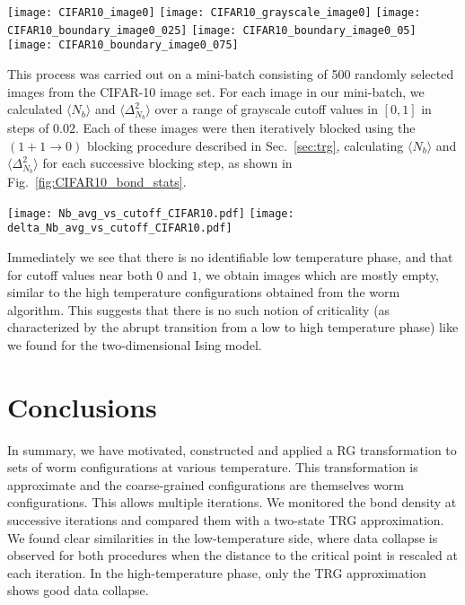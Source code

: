 \documentclass[../main.tex]{subfiles}
\begin{document}
\begin{figure*}[htpb]
    \centering
    \texttt{[image: CIFAR10\_image0]}\hspace{1.5cm}
    \texttt{[image: CIFAR10\_grayscale\_image0]}
    \texttt{[image: CIFAR10\_boundary\_image0\_025]}\hfill
    \texttt{[image: CIFAR10\_boundary\_image0\_05]}\hfill
    \texttt{[image: CIFAR10\_boundary\_image0\_075]}
    \caption{\label{fig:CIFAR10_preprocessing} Example of preprocessing steps
        for converting CIFAR-10 images to `worm-like' images, illustrating the
        resulting image for different values of the grayscale cuttoff. (a)
    Original image from CIFAR-10 dataset. (b) Image converted to grayscale.
    (c) Resulting image from cutoff values of $0.25$, (d) $0.5$, and (e)
    $0.75$.}
\end{figure*}
%
%
This process was carried out on a mini-batch consisting of 500 randomly
selected images from the CIFAR-10 image set.  For each image in our mini-batch,
we calculated $\langle N_b\rangle$ and $\langle \Delta_{N_b}^2\rangle$ over a
range of grayscale cutoff values in $[0, 1]$ in steps of $0.02$. Each of these
images were then iteratively blocked using the $(1 + 1 \rightarrow 0)$ blocking
procedure described in Sec.~\ref{sec:trg}, calculating $\langle N_b\rangle$ and
$\langle \Delta_{N_b}^2\rangle$ for each successive blocking step, as shown in
Fig.~\ref{fig:CIFAR10_bond_stats}.
%
\begin{figure*}[htpb]
    \centering
    \texttt{[image: Nb\_avg\_vs\_cutoff\_CIFAR10.pdf]}
    \texttt{[image: delta\_Nb\_avg\_vs\_cutoff\_CIFAR10.pdf]}
    \caption{$\langle N_b\rangle$ and $\langle \Delta_{N_b}^2\rangle$ vs.\
    grayscale cutoff value for 500 randomly chosen images from the CIFAR-10
  dataset.}%
\label{fig:CIFAR10_bond_stats}
\end{figure*}
%
Immediately we see that there is no identifiable low temperature phase, and
that for cutoff values near both $0$ and $1$, we obtain images which are mostly
empty, similar to the high temperature configurations obtained from the worm
algorithm.  This suggests that there is no such notion of criticality (as
characterized by the abrupt transition from a low to high temperature phase)
like we found for the two-dimensional Ising model.

\section{Conclusions}
In summary, we have motivated, constructed and applied a
RG transformation to sets of worm configurations at various temperature. This
transformation is approximate and the coarse-grained configurations are
themselves worm configurations. This allows multiple iterations. We monitored
the bond density at successive iterations and compared them with a two-state
TRG approximation.  We found clear similarities in the low-temperature side,
where data collapse is observed for both procedures when the distance to the
critical point is rescaled at each iteration. In the high-temperature phase,
only the TRG approximation shows good data collapse. 
\end{document}
